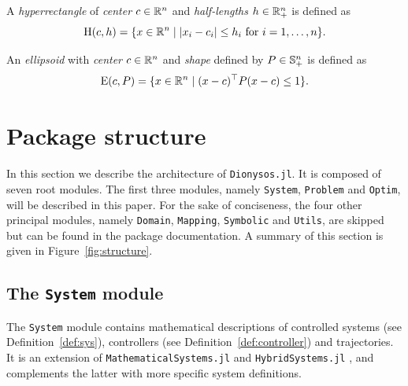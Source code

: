 \documentclass{juliacon}
\begin{document}
\begin{defi} \label{def:hyperrectangle}
    A \emph{hyperrectangle} of \emph{center} $c\in\mathbb{R}^n$ and \emph{half-lengths} $h\in \mathbb{R}^n_{+}$ is defined as 
    \[ \operatorname{H}(c,h) = \{x\in\mathbb{R}^n \mid |x_i-c_i|\le h_i \text{ for }i=1,\ldots,n\}. \]
\end{defi}
\begin{defi} \label{def:ellipsoid}
    An \emph{ellipsoid} with \emph{center} $c\in\mathbb{R}^n$ and \emph{shape} defined by $P\in \mathbb{S}_{+}^{n}$ is defined as 
    \[ \operatorname{E}(c,P) =  \{x\in\mathbb{R}^n\mid (x-c)^\top P(x-c) \le 1\}.\]
\end{defi}

\section{Package structure}
\label{sec:package}

In this section we describe the architecture of \texttt{Dionysos.jl}. It is composed of seven root modules. The first three modules, namely \texttt{System}, \texttt{Problem} and \texttt{Optim}, will be described in this paper. For the sake of conciseness, the four other principal modules, namely \texttt{Domain}, \texttt{Mapping}, \texttt{Symbolic} and \texttt{Utils}, are skipped but can be found in the package documentation. A summary of this section is given in Figure~\ref{fig:structure}.

\subsection{The \texttt{System} module}

The \texttt{System} module contains mathematical descriptions of controlled systems (see Definition~\ref{def:sys}), controllers (see Definition~\ref{def:controller}) and trajectories. It is an extension of \texttt{MathematicalSystems.jl} and \texttt{HybridSystems.jl} \cite{BenoitLegat2024}, and complements the latter with more specific system definitions.

\vskip 6pt
\end{document}
